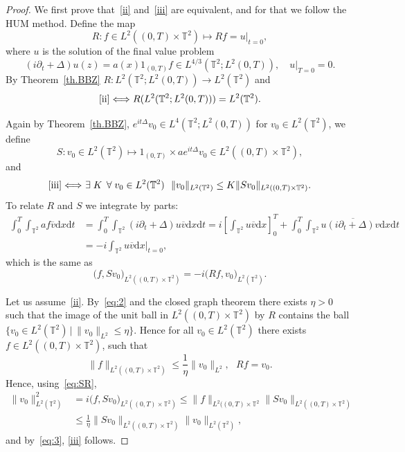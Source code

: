 \documentclass[AHL, Unicode, longabstracts]{cedram}
\newcommand{\TT}{{\mathbb T}}
\newcommand{\TT}{{\mathbb T}}
\newcommand*{\dd}{\mathrm{d}}
\newcommand*{\dx}{\dd x}
\newcommand*{\dt}{\dd t}
\let\oldexists\exists
\renewcommand*{\exists}{\mathrel{\oldexists}}
\let\oldforall\forall
\renewcommand*{\forall}{\mathrel{\oldforall}}
\newcommand*{\tq}{\,|\,}
\begin{document}
\begin{proof}
We first prove that~\eqref{ii} and~\eqref{iii} are equivalent, and for that we follow the HUM method. Define the map
\[
R: f \in L^2((0,T) \times \TT^2) \mapsto R f = u |_{t=0},
\]
where $u$ is the solution of the final value problem
\[
(i \partial_t + \Delta) u (z) = a(x) 1_{(0,T)}f \in L^{4/3}(\TT^2; L^2(0,T)), \quad u |_{T=0} =0.
\]
By Theorem~\ref{th.BBZ} $ R : L^{2}(\TT^2; L^2(0,T)) \to L^2 (\TT^2) $ and
\begin{equation}\label{eq:2}
\eqref{ii}\Longleftrightarrow R (L^{2}(\TT^2; L^2(0,T))) = L^2 (\TT^2).
\end{equation}

Again by Theorem~\ref{th.BBZ}, $e^{it \Delta} v_0 \in L^4(\TT^2; L^2(0,T)) $ for $ v_0 \in L^2 (\TT^2) $, we define
\[
S: v_0 \in L^2(\TT^2) \mapsto 1_{(0,T)} \times a e^{it \Delta} v_0 \in L^2((0,T) \times \TT^2),
\]
and
\begin{equation}\label{eq:3}
\eqref{iii}\Longleftrightarrow \ \exists K \, \forall v_0 \in L^2 (\TT^2) \ \
\| v_0 \|_{L^2 (\TT^2) } \leq K\| S v_0 \|_{L^2 ((0, T) \times \TT^2)}.
\end{equation}
To relate $ R $ and $ S $ we integrate by parts:
\[
\begin{split}
\int_0^T \!\!\int_{\TT^2} af \overline {v} \dx \dt &= \int_0^T \!\!\int_{\TT^2} (i \partial_t + \Delta) u \overline {v} \dx \dt = i \left[\int_{\TT^2} u \overline{v} \dx \right] _0 ^T +\int_0^T \!\!\int_{\TT^2} u \overline {(i \partial_t + \Delta)v} \dx \dt
\\ & = -i \int_{\TT^2} u \overline{v} \dx|_{t=0},
\end{split}
\]
which is the same as
\begin{equation}\label{eq:SR}
\bigl(f, Sv_0\bigr)_{L^2((0,T)\times \TT^2)} = -i \bigl(Rf, v_0\bigr)_{L^2(\TT^2)}.
\end{equation}

Let us assume~\eqref{ii}. By~\eqref{eq:2} and the closed graph theorem there exists $\eta>0$ such that the image of the unit ball in $L^2((0,T) \times \TT^2)$ by $R$ contains the ball $ \{ v_0 \in L^2 (\TT^2) \tq \| v_0 \|_{L^2} \leq \eta \} $. Hence for all $ v_0 \in L^2 (\TT^2) $ there exists $ f \in L^2((0,T) \times \TT^2)$, such that
\[
\| f \|_{ L^2 ((0,T) \times \TT^2) } \leq \frac 1 \eta \| v_0\|_{ L^2}, \ \ \ R f = v_0.
\]
Hence, using~\eqref{eq:SR},
\begin{equation}
\begin{split}
\| v_0 \| _{L^2(\TT^2)}^2 & = i \bigl(f, Sv_0\bigr)_{L^2((0,T)\times \TT^2)} \leq \| f\|_{L^2((0,T)\times \TT^2} \| Sv_0 \|_{L^2((0,T)\times \TT^2)}
\\
& \leq \frac 1 \eta \| Sv_0 \|_{L^2((0,T)\times \TT^2)}
\| v_0 \| _{L^2(\TT^2)},
\end{split}
\end{equation}
and by~\eqref{eq:3}, {\eqref{iii}} follows.


\end{proof}
\end{document}
